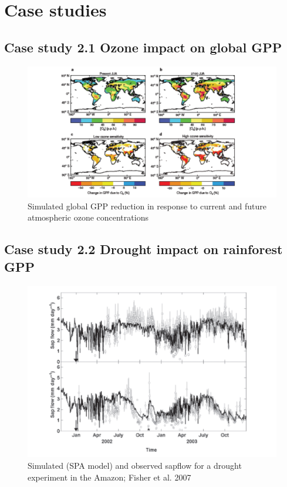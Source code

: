 \documentclass[
  oneside]{book}
\begin{document}
\hypertarget{case-studies}{%
\section{Case studies}\label{case-studies}}

\hypertarget{case-study-2.1-ozone-impact-on-global-gpp}{%
\subsection{Case study 2.1 Ozone impact on global GPP}\label{case-study-2.1-ozone-impact-on-global-gpp}}

\begin{figure}

{\centering \includegraphics[width=0.8\linewidth]{figures/chap2/ozone} 

}

\caption{Simulated global GPP reduction in response to current and future atmospheric ozone concentrations}\label{fig:f223}
\end{figure}

\hypertarget{case-study-2.2-drought-impact-on-rainforest-gpp}{%
\subsection{Case study 2.2 Drought impact on rainforest GPP}\label{case-study-2.2-drought-impact-on-rainforest-gpp}}

\begin{figure}

{\centering \includegraphics[width=0.8\linewidth]{figures/chap2/fisher1} 

}

\caption{Simulated (SPA model) and observed sapflow for a drought experiment in the Amazon; Fisher et al. 2007}\label{fig:f224}
\end{figure}
\end{document}
